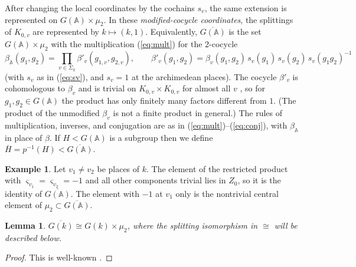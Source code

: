 \documentclass[12pt,letterpaper,openany]{book}
\theoremstyle{plain}
\newtheorem{lemma}[theorem]{Lemma}
\theoremstyle{definition}
\newtheorem{example}[theorem]{Example}
\theoremstyle{remark}
\theoremstyle{remark}
\begin{document}
After changing the local coordinates by the cochains $s_v$, the same
extension is represented on $G(\mathbb A)\times\mu_2$.
In these \emph{modified-cocycle coordinates}, the splittings of
$K_{0,v}$ are represented by $k\mapsto(k,1)$.
Equivalently, $\overline{G({\mathbb{A}})}$ is the set $G({\mathbb{A}})\times\mu_2$
with the multiplication (\ref{eq:mult}) for the 2-cocycle
\[
\beta_{\mathbb{A}}(g_1,g_2)=\prod_{v\in \Sigma_k}\beta'_v(g_{1,v},g_{2,v}),\qquad
\beta'_v(g_1,g_2)=\beta_v(g_1,g_2)\,s_v(g_1)\,s_v(g_2)\,s_v(g_1g_2)^{-1}
\]
(with $s_v$ as in (\ref{eq:sv}), and $s_v=1$ at the archimedean places). The cocycle $\beta'_v$
is cohomologous to $\beta_v$ and is trivial on $K_{0,v}\times K_{0,v}$ for
almost all $v$ \cite{K2}, so for $g_1,g_2\in G({\mathbb{A}})$ the product
has only finitely many factors different from $1$. (The product of the
unmodified $\beta_v$ is not a finite product in general.) The rules of multiplication, inverses, and conjugation are as in
(\ref{eq:mult})--(\ref{eq:conj}), with $\beta_{\mathbb{A}}$ in place of
$\beta$. If $H<G({\mathbb{A}})$ is a subgroup then we define
$\overline{H}=p^{-1}(H)<\overline{G({\mathbb{A}})}$.

\begin{example}
Let $v_1\neq v_2$ be places of $k$. The element of the restricted
product with $\varsigma_{v_1}=\varsigma_{v_2}=-1$ and all other
components trivial lies in $Z_0$, so it is the identity of
$\overline{G({\mathbb{A}})}$. The element with $-1$ at $v_1$ only is the
nontrivial central element of $\mu_2\subset\overline{G({\mathbb{A}})}$.
\end{example}

\begin{lemma}\label{lem:Gk-split}
$\overline{G(k)}\cong G(k)\times \mu _2$,
where the splitting isomorphism in $\cong$ will be
described below.
\end{lemma}

\begin{proof} This is well-known \cite{K2}.
\end{proof}
\end{document}
